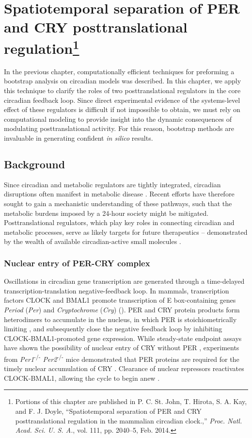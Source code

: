 \chapter[Spatiotemporal separation of PER and CRY posttranslational regulation]{Spatiotemporal separation of PER and CRY posttranslational regulation\footnote{Portions of this chapter are published in P. C. St. John, T. Hirota, S. A. Kay, and F. J. Doyle, ``Spatiotemporal separation of PER and CRY posttranslational regulation in the mammalian circadian clock.,'' {\itshape Proc. Natl. Acad. Sci. U. S. A.}, vol. 111, pp. 2040–5, Feb. 2014.}}

In the previous chapter, computationally efficient techniques for preforming a bootstrap analysis on circadian models was described. 
In this chapter, we apply this technique to clarify the roles of two posttranslational regulators in the core circadian feedback loop. 
Since direct experimental evidence of the systems-level effect of these regulators is difficult if not impossible to obtain, we must rely on computational modeling to provide insight into the dynamic consequences of modulating posttranslational activity. 
For this reason, bootstrap methods are invaluable in generating confident {\itshape in silico} results. 

\section{Background}

Since circadian and metabolic regulators are tightly integrated, circadian disruptions often manifest in metabolic disease \cite{Bass2012}. 
Recent efforts have therefore sought to gain a mechanistic understanding of these pathways, such that the metabolic burdens imposed by a 24-hour society might be mitigated. 
Posttranslational regulators, which play key roles in connecting circadian and metabolic processes, serve as likely targets for future therapeutics -- demonstrated by the wealth of available circadian-active small molecules \cite{Chen2013}.

\subsection{Nuclear entry of PER-CRY complex}
Oscillations in circadian gene transcription are generated through a time-delayed transcription-translation negative-feedback loop. 
In mammals, transcription factors CLOCK and BMAL1 promote transcription of E box-containing genes {\it Period} ({\it Per}) and {\it Cryptochrome} ({\it Cry}) (). 
PER and CRY protein products form heterodimers to accumulate in the nucleus, in which PER is stoichiometrically limiting \cite{Lee2001}, and subsequently close the negative feedback loop by inhibiting CLOCK-BMAL1-promoted gene expression. 
While steady-state endpoint assays have shown the possibility of nuclear entry of CRY without PER \cite{Ye2011, Kume1999, Yagita2002}, experiments from {\it Per1}\textsuperscript{-/-} {\it Per2}\textsuperscript{-/-} mice demonstrated that PER proteins are required for the timely nuclear accumulation of CRY \cite{Lee2001}. 
Clearance of nuclear repressors reactivates CLOCK-BMAL1, allowing the cycle to begin anew \cite{Takahashi2008}. 

